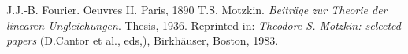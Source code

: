 \documentclass[12pt, a4paper]{article}
\begin{document}
\begin{thebibliography}{9}
 J.J.-B. Fourier. Oeuvres II. Paris, 1890
 T.S. Motzkin. {\em Beitr\"{a}ge zur Theorie der linearen Ungleichungen}. Thesis, 1936. Reprinted in: {\em Theodore S. Motzkin: selected papers} (D.Cantor et al., eds,), Birkh\"{a}user, Boston, 1983.
\end{thebibliography}
\end{document}
